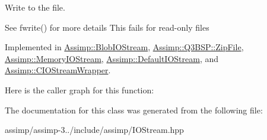 Write to the file. 

See fwrite() for more details This fails for read-\/only files 

Implemented in \hyperlink{class_assimp_1_1_blob_i_o_stream_aed9dda065eee635d2f8c9eeb8133461a}{Assimp\+::\+Blob\+I\+O\+Stream}, \hyperlink{class_assimp_1_1_q3_b_s_p_1_1_zip_file_a89063c9dfe5d0f025932df554a015c0d}{Assimp\+::\+Q3\+B\+S\+P\+::\+Zip\+File}, \hyperlink{class_assimp_1_1_memory_i_o_stream_a9ac5af341c3ed61137313264e1b5f964}{Assimp\+::\+Memory\+I\+O\+Stream}, \hyperlink{class_assimp_1_1_default_i_o_stream_aea9db55f57be5258d92fe7bf9a4e2023}{Assimp\+::\+Default\+I\+O\+Stream}, and \hyperlink{class_assimp_1_1_c_i_o_stream_wrapper_a6db07944a779a7cc8639c3b198b61c1a}{Assimp\+::\+C\+I\+O\+Stream\+Wrapper}.



Here is the caller graph for this function\+:




The documentation for this class was generated from the following file\+:\begin{DoxyCompactItemize}
\item 
assimp/assimp-\/3../include/assimp/I\+O\+Stream.\+hpp\end{DoxyCompactItemize}
